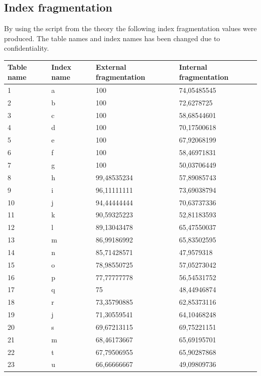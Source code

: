 \documentclass{cslthse-msc}
\begin{document}
\subsection{Index fragmentation}
By using the script from the theory the following index fragmentation values were produced. The table names and index names has been changed due to confidentiality.

\begin{table}[H]
\begin{center}
\begin{tabular}{|l|l|l|l|}
\hline
Table name & Index name & External fragmentation & Internal fragmentation \\ \hline 
1  & a & 100         & 74,05485545 \\ \hline
2  & b & 100         & 72,6278725  \\ \hline
3  & c & 100         & 58,68544601 \\ \hline
4  & d & 100         & 70,17500618 \\ \hline
5  & e & 100         & 67,92068199 \\ \hline
6  & f & 100         & 58,46971831 \\ \hline
7  & g & 100         & 50,03706449 \\ \hline
8  & h & 99,48535234 & 57,89085743 \\ \hline
9  & i & 96,11111111 & 73,69038794 \\ \hline
10 & j & 94,44444444 & 70,63737336 \\ \hline
11 & k & 90,59325223 & 52,81183593 \\ \hline
12 & l & 89,13043478 & 65,47550037 \\ \hline
13 & m & 86,99186992 & 65,83502595 \\ \hline
14 & n & 85,71428571 & 47,9579318  \\ \hline
15 & o & 78,98550725 & 57,05273042 \\ \hline
16 & p & 77,77777778 & 56,54531752 \\ \hline
17 & q & 75          & 48,44946874 \\ \hline
18 & r & 73,35790885 & 62,85373116 \\ \hline
19 & j & 71,30559541 & 64,10468248 \\ \hline
20 & s & 69,67213115 & 69,75221151 \\ \hline
21 & m & 68,46173667 & 65,69195701 \\ \hline
22 & t & 67,79506955 & 65,90287868 \\ \hline
23 & u & 66,66666667 & 49,09809736 \\ \hline

\end{tabular}
\end{center}
\end{table}
\end{document}
